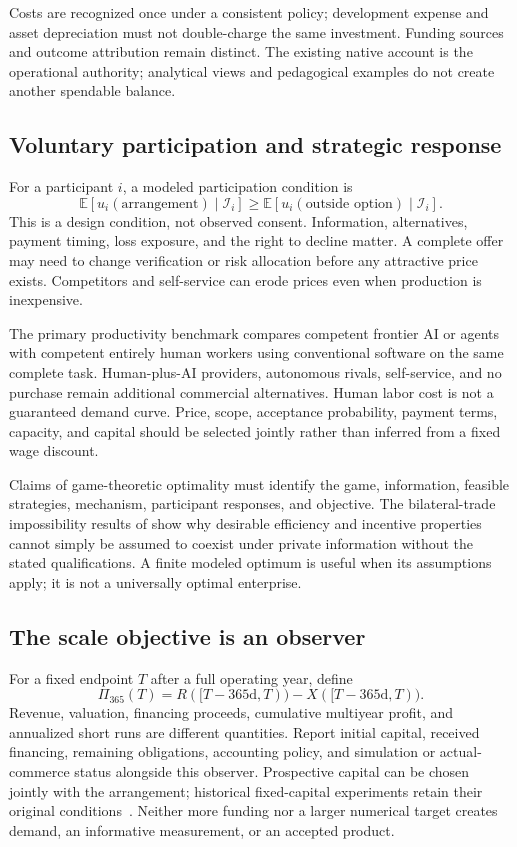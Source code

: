 \documentclass[10pt,a4paper]{article}
\begin{document}
Costs are recognized once under a consistent policy; development expense and asset depreciation must not double-charge the same investment. Funding sources and outcome attribution remain distinct. The existing native account is the operational authority; analytical views and pedagogical examples do not create another spendable balance.

\subsection{Voluntary participation and strategic response}

For a participant $i$, a modeled participation condition is
\begin{equation}
\mathbb E[u_i(\text{arrangement})\mid\mathcal I_i]
\geq \mathbb E[u_i(\text{outside option})\mid\mathcal I_i].
\end{equation}
This is a design condition, not observed consent. Information, alternatives, payment timing, loss exposure, and the right to decline matter. A complete offer may need to change verification or risk allocation before any attractive price exists. Competitors and self-service can erode prices even when production is inexpensive.

The primary productivity benchmark compares competent frontier AI or agents with competent entirely human workers using conventional software on the same complete task. Human-plus-AI providers, autonomous rivals, self-service, and no purchase remain additional commercial alternatives. Human labor cost is not a guaranteed demand curve. Price, scope, acceptance probability, payment terms, capacity, and capital should be selected jointly rather than inferred from a fixed wage discount.

Claims of game-theoretic optimality must identify the game, information, feasible strategies, mechanism, participant responses, and objective. The bilateral-trade impossibility results of \citet{myerson} show why desirable efficiency and incentive properties cannot simply be assumed to coexist under private information without the stated qualifications. A finite modeled optimum is useful when its assumptions apply; it is not a universally optimal enterprise.

\subsection{The scale objective is an observer}

For a fixed endpoint $T$ after a full operating year, define
\begin{equation}
\Pi_{365}(T)=R([T-365\text{d},T))-X([T-365\text{d},T)).
\end{equation}
Revenue, valuation, financing proceeds, cumulative multiyear profit, and annualized short runs are different quantities. Report initial capital, received financing, remaining obligations, accounting policy, and simulation or actual-commerce status alongside this observer. Prospective capital can be chosen jointly with the arrangement; historical fixed-capital experiments retain their original conditions~\citep{mandate}. Neither more funding nor a larger numerical target creates demand, an informative measurement, or an accepted product.
\end{document}
